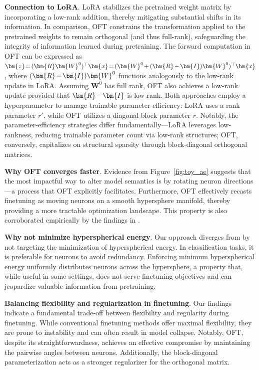 \textbf{Connection to LoRA}. LoRA stabilizes the pretrained weight matrix by incorporating a low-rank addition, thereby mitigating substantial shifts in its information. In comparison, OFT constrains the transformation applied to the pretrained weights to remain orthogonal (and thus full-rank), safeguarding the integrity of information learned during pretraining. The forward computation in OFT can be expressed as $\thickmuskip=2mu \medmuskip=2mu \bm{z}=(\bm{R}\bm{W}^0)^\top\bm{x}=(\bm{W}^0+(\bm{R}-\bm{I})\bm{W}^0)^\top\bm{x}$, where $\thickmuskip=2mu \medmuskip=2mu (\bm{R}-\bm{I})\bm{W}^0$ functions analogously to the low-rank update in LoRA. Assuming $\bm{W}^0$ has full rank, OFT also achieves a low-rank update provided that $\thickmuskip=2mu \medmuskip=2mu \bm{R}-\bm{I}$ is low-rank. Both approaches employ a hyperparameter to manage trainable parameter efficiency: LoRA uses a rank parameter $r'$, while OFT utilizes a diagonal block parameter $r$. Notably, the parameter-efficiency strategies differ fundamentally—LoRA leverages low-rankness, reducing trainable parameter count via low-rank structures; OFT, conversely, capitalizes on structural sparsity through block-diagonal orthogonal matrices.

\textbf{Why OFT converges faster}. Evidence from Figure~\ref{fig:toy_ae} suggests that the most impactful way to alter model semantics is by rotating neuron directions—a process that OFT explicitly facilitates. Furthermore, OFT effectively recasts finetuning as moving neurons on a smooth hypersphere manifold, thereby providing a more tractable optimization landscape. This property is also corroborated empirically by the findings in \cite{liu2021orthogonal}.

\textbf{Why not minimize hyperspherical energy}. Our approach diverges from \cite{liu2021orthogonal} by not targeting the minimization of hyperspherical energy. In classification tasks, it is preferable for neurons to avoid redundancy. Enforcing minimum hyperspherical energy uniformly distributes neurons across the hypersphere, a property that, while useful in some settings, does not serve finetuning objectives and can jeopardize valuable information from pretraining.

\textbf{Balancing flexibility and regularization in finetuning}. Our findings indicate a fundamental trade-off between flexibility and regularity during finetuning. While conventional finetuning methods offer maximal flexibility, they are prone to instability and can often result in model collapse. Notably, OFT, despite its straightforwardness, achieves an effective compromise by maintaining the pairwise angles between neurons. Additionally, the block-diagonal parameterization acts as a stronger regularizer for the orthogonal matrix.

